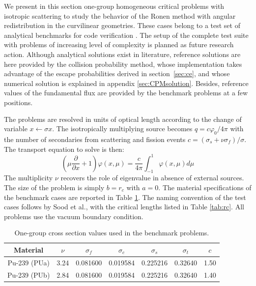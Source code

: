 \documentclass{ictt26}
\begin{document}
We present in this section one-group homogeneous critical problems with isotropic scattering to study the behavior of the Ronen method with angular redistribution in the curvilinear geometries. These cases belong to a test set of analytical benchmarks for code verification \cite{sood2003analytical}. The setup of the complete test suite with problems of increasing level of complexity is planned as future research action. Although analytical solutions exist in literature, reference solutions are here provided by the collision probability method, whose implementation takes advantage of the escape probabilities derived in section~\ref{sec:ce}, and whose numerical solution is explained in appendix \ref{sec:CPMsolution}. Besides, reference values of the fundamental flux are provided by the benchmark problems at a few positions.

The problems are resolved in units of optical length according to the change of variable $x \leftarrow \sigma x$. The isotropically multiplying source becomes $q = c \varphi_0 / 4\pi$ with the number of secondaries from scattering and fission events $c = (\sigma_s + \nu \sigma_f)/\sigma$. The transport equation to solve is then:
\[
\left( \mu \frac{\partial}{\partial x} + 1\right) \varphi(x,\mu)
 = \frac{c}{4 \pi}\int_{-1}^{1}{\varphi(x,\mu) d\mu}
\]
The multiplicity $\nu$ recovers the role of eigenvalue in absence of external sources. The size of the problem is simply $b=r_c$ with $a=0$. %
The material specifications of the benchmark cases are reported in Table \ref{tab:xs}. The naming convention of the test cases follows by Sood et al., with the critical lengths listed in Table \ref{tab:rc}. All problems use the vacuum boundary condition. %

\begin{table}[htb]
\centering
\caption{One-group cross section values used in the benchmark problems.}\label{tab:xs}
\begin{tabular}{c|*{6}{l}}
Material & \multicolumn{1}{c}{$\nu$} & \multicolumn{1}{c}{$\sigma_f$} & \multicolumn{1}{c}{$\sigma_c$} & \multicolumn{1}{c}{$\sigma_s$} & \multicolumn{1}{c}{$\sigma_t$} & \multicolumn{1}{c}{$c$}\\ \hline
Pu-239 (PUa)& 3.24 & 0.081600 & 0.019584 & 0.225216 & 0.32640 & 1.50\\
Pu-239 (PUb)& 2.84 & 0.081600 & 0.019584 & 0.225216 & 0.32640 & 1.40\\
\end{tabular}
\end{table}
\end{document}
